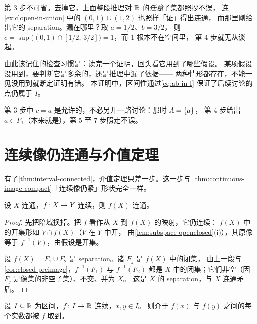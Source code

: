 \begin{pitfall}
  第 3 步不可省。去掉它，上面整段推理对 \(\mathbb{R}\) 的\emph{任意}子集都照抄不误，
  连\cref{ex:clopen-in-union} 中的 \((0,1) \cup (1,2)\) 也照样「证」得出连通，
  而那里刚给出它的 separation。漏在哪里？取 \(a = 1/2\)、\(b = 3/2\)，
  则 \(c = \sup\bigl((0,1) \cap [1/2,\,3/2]\bigr) = 1\)，而 \(1\) 根本不在空间里，
  第 4 步就无从谈起。

  由此该记住的检查习惯是：读完一个证明，回头看它用到了哪些假设。
  某项假设没用到，要判断它是多余的，还是推理中漏了依据——
  两种情形都存在，不能一见没用到就断定证明有错。
  本证明中，区间性通过\cref{eq:ab-in-I} 保证了后续讨论的点仍属于 \(I\)。
\end{pitfall}

\begin{remark}
  第 3 步中 \(c=a\) 是允许的，不必另开一路讨论：那时 \(A=\left\{a\right\}\)，
  第 4 步给出 \(a \in F_{1}\)（本来就是），第 5 至 7 步照走不误。
\end{remark}

\section{连续像仍连通与介值定理}
\label{sec:ivt}

有了\cref{thm:interval-connected}，介值定理只差一步。这一步与%
\cref{thm:continuous-image-compact}「连续像仍紧」形状完全一样。

\begin{theorem}[连续像仍连通]
  \label{thm:continuous-image-connected}
  设 \(X\) 连通，\(f \colon X \to Y\) 连续，则 \(f(X)\) 连通。
\end{theorem}

\begin{proof}
  先把陪域换掉。把 \(f\) 看作从 \(X\) 到 \(f(X)\) 的映射，它仍连续：
  \(f(X)\) 中的开集形如 \(V \cap f(X)\)（\(V\) 在 \(Y\) 中开，
  由\cref{lem:subspace-openclosed}(i)），其原像等于 \(f^{-1}(V)\)，由假设是开集。

  设 \(f(X) = F_{1} \cup F_{2}\) 是 separation。诸 \(F_{j}\) 是 \(f(X)\) 中的闭集，
  由上一段与\cref{cor:closed-preimage}，\(f^{-1}(F_{1})\) 与 \(f^{-1}(F_{2})\)
  都是 \(X\) 中的闭集；它们非空（因 \(F_{j}\) 是像集的非空子集）、不交、并为 \(X\)。
  这是 \(X\) 的 separation，与 \(X\) 连通矛盾。
\end{proof}

\begin{corollary}[介值定理]
  \label{cor:ivt}
  设 \(I \subseteq \mathbb{R}\) 为区间，\(f \colon I \to \mathbb{R}\) 连续，\(x,y \in I\)。
  则介于 \(f(x)\) 与 \(f(y)\) 之间的每个实数都被 \(f\) 取到。
\end{corollary}

